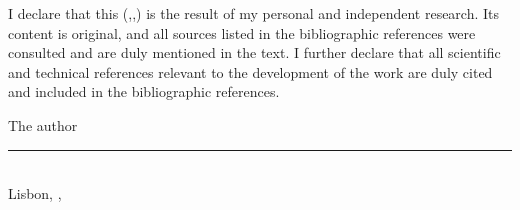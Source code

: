 \makeatletter
I declare that this \MakeLowercase{\thedoctypestr(\iselthesis@opt@docdegree,\iselthesis@opt@doctype,\iselthesis@opt@coverlang)} is the result of my personal and independent research. Its content is original, and all sources listed in the bibliographic references were consulted and are duly mentioned in the text. I further declare that all scientific and technical references relevant to the development of the work are duly cited and included in the bibliographic references.
\makeatother
\begin{center}
The author
\\[3em]

\rule{.5\textwidth}{1pt}
\\[.5em]
\fontsize{10}{12.2}
\selectfont
Lisbon, \thedatemonth{}, \thedateday{ }\thedateyear
\end{center}
